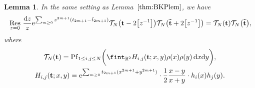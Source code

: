 \documentclass[pdftex]{sigma}
\numberwithin{equation}{section}
\newcommand{\dd}{\mathrm{d}}
\newcommand{\Res}{\mathop{\,\rm Res\,}}
\newtheorem{Lemma}[Theorem]{Lemma}
\begin{document}
\begin{Lemma}
\label{lemfinal} In the same setting as Lemma~$\ref{thm:BKPlem}$, we have
\begin{equation*}
\begin{split}
\Res_{z = 0} \frac{\dd z}{z} {\rm e}^{\sum_{m \geq 0} z^{2m + 1} (t_{2m + 1} - \tilde{t}_{2m + 1})} \mathcal{T}_N\bigl(\mathbf{t} - 2\bigl[z^{-1}\bigr]\bigr) \mathcal{T}_N\bigl(\tilde{\mathbf{t}} + 2\bigl[z^{-1}\bigr]\bigr) = \mathcal{T}_N(\mathbf{t})\mathcal{T}_N\bigl(\tilde{\mathbf{t}}\bigr),
\end{split}
\end{equation*}
where
\begin{gather}
\mathcal{T}_N(\mathbf{t}) = \operatorname{Pf}_{1 \leq i,j \leq N} \biggl( \fint_{\mathbb{R}^2} H_{i,j}(\mathbf{t};x,y) \rho(x)\rho(y)\, \dd x \dd y \biggr), \nonumber\\
H_{i,j}(\mathbf{t};x,y) = {\rm e}^{\sum_{m \geq 0} t_{2m + 1}(x^{2m + 1} + y^{2m + 1})} \cdot \frac{1}{2} \frac{x - y}{x + y}\cdot h_i(x)h_j(y) . \label{Hijt}
\end{gather}
\end{Lemma}
\end{document}
